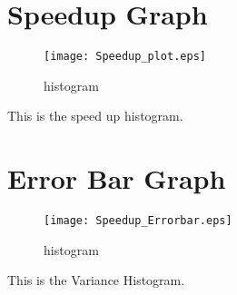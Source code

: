 \documentclass{article}
\begin{document}
\section{Speedup Graph}
\begin{figure}[H]
    \centering
    \texttt{[image: Speedup\_plot.eps]}
    \caption{histogram}
    \label{fig:my_label}
\end{figure}
This is the speed up histogram.\\

\section{Error Bar Graph}
\begin{figure}[H]
    \centering
    \texttt{[image: Speedup\_Errorbar.eps]}
    \caption{histogram}
    \label{fig:my_label}
\end{figure}
This is the Variance Histogram.\\
\end{document}
